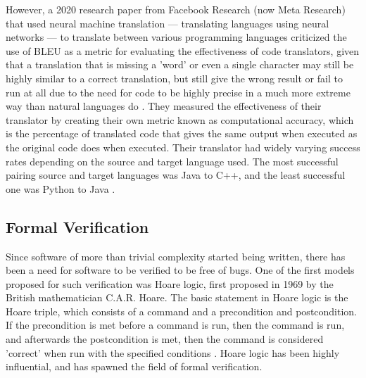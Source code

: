However, a 2020 research paper from Facebook Research (now Meta Research) that used neural machine translation --- translating languages using neural networks --- to translate between various programming languages criticized the use of BLEU as a metric for evaluating the effectiveness of code translators, given that a translation that is missing a 'word' or even a single character may still be highly similar to a correct translation, but still give the wrong result or fail to run at all due to the need for code to be highly precise in a much more extreme way than natural languages do \autocite{Roziere}. They measured the effectiveness of their translator by creating their own metric known as computational accuracy, which is the percentage of translated code that gives the same output when executed as the original code does when executed. Their translator had widely varying success rates depending on the source and target language used. The most successful pairing source and target languages was Java to C++, and the least successful one was Python to Java \autocite{Roziere}.

\subsection{Formal Verification}
Since software of more than trivial complexity started being written, there has been a need for software to be verified to be free of bugs. One of the first models proposed for such verification was Hoare logic, first proposed in 1969 by the British mathematician C.A.R. Hoare. The basic statement in Hoare logic is the Hoare triple, which consists of a command and a precondition and postcondition. If the precondition is met before a command is run, then the command is run, and afterwards the postcondition is met, then the command is considered 'correct' when run with the specified conditions \autocite{Hoare}. Hoare logic has been highly influential, and has spawned the field of formal verification.

